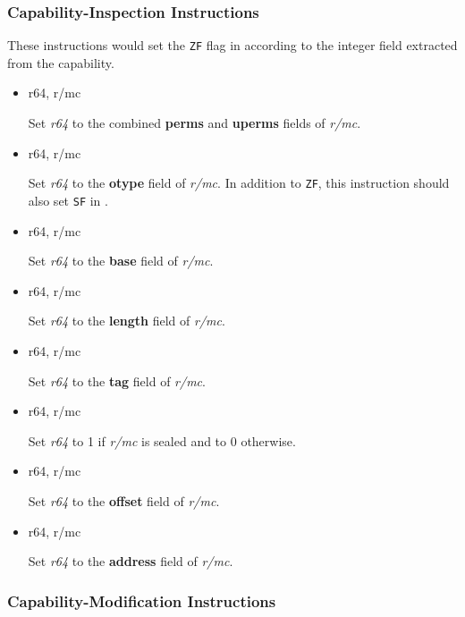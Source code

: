 \subsubsection{Capability-Inspection Instructions}

These instructions would set the \texttt{ZF} flag in \RFLAGS{}
according to the integer field
extracted from the capability.

\begin{itemize}
  \item {} r64, r/mc

    Set \emph{r64} to the combined \textbf{perms} and \textbf{uperms}
    fields of \emph{r/mc}.

  \item {} r64, r/mc

    Set \emph{r64} to the \textbf{otype} field of \emph{r/mc}.  In
    addition to \texttt{ZF}, this instruction should also set
    \texttt{SF} in \RFLAGS{}.

  \item {} r64, r/mc

    Set \emph{r64} to the \textbf{base} field of \emph{r/mc}.

  \item {} r64, r/mc

    Set \emph{r64} to the \textbf{length} field of \emph{r/mc}.

  \item {} r64, r/mc

    Set \emph{r64} to the \textbf{tag} field of \emph{r/mc}.

  \item {} r64, r/mc

    Set \emph{r64} to 1 if \emph{r/mc} is sealed and to 0 otherwise.

  \item {} r64, r/mc

    Set \emph{r64} to the \textbf{offset} field of \emph{r/mc}.

  \item {} r64, r/mc

    Set \emph{r64} to the \textbf{address} field of \emph{r/mc}.
\end{itemize}

\subsubsection{Capability-Modification Instructions}

